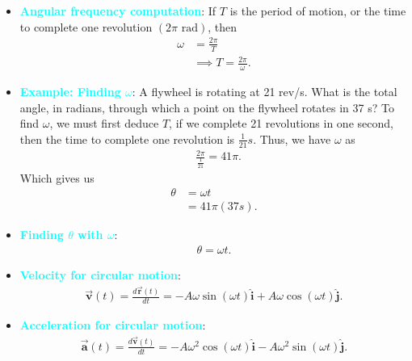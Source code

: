 \documentclass{report}
\begin{document}
\begin{itemize}
            \item \textbf{\textcolor{cyan}{Angular frequency computation}}:
                If $T$ is the period of motion, or the time to complete one revolution $(2\pi \text{ rad})$, then 
                \begin{align*}
                    \omega &= \frac{2\pi}{T} \\
                    &\implies T = \frac{2\pi}{\omega}
                .\end{align*}
            \item \textbf{\textcolor{cyan}{Example: Finding $\omega$}}: A flywheel is rotating at 21 rev/s. What is the total angle, in radians, through which a point on the flywheel rotates in 37 s?
                \bigbreak \noindent 
                To find $\omega$, we must first deduce $T$, if we complete 21 revolutions in one second, then the time to complete one revolution is $\frac{1}{21}s$. Thus, we have $\omega$ as 
                \begin{align*}
                    &\frac{2\pi}{\frac{1}{21}} = 41\pi
                .\end{align*}
                Which gives us 
                \begin{align*}
                    \theta  &= \omega t \\
                    &=41\pi(37s)
                .\end{align*}
            \item \textbf{\textcolor{cyan}{Finding $\theta$ with $\omega$}}:
                \begin{align*}
                    \theta  = \omega t
                .\end{align*}
            \item \textbf{\textcolor{cyan}{Velocity for circular motion}}:
                \begin{align*}
                    \vec{\mathbf{v}}(t) = \frac{d\vec{\mathbf{r}}(t)}{dt} = -A\omega\sin{(\omega t)}\hat{\mathbf{i}} + A\omega\cos{(\omega t)}\hat{\mathbf{j}}
                .\end{align*}
            \item \textbf{\textcolor{cyan}{Acceleration for circular motion}}:
                \begin{align*}
                    \vec{\mathbf{a}}(t) = \frac{d\vec{\mathbf{v}}(t)}{dt} = -A\omega^{2}\cos{(\omega t)}\hat{\mathbf{i}} - A\omega^{2}\sin{(\omega t)}\hat{\mathbf{j}}
                .\end{align*}

\end{itemize}
\end{document}
